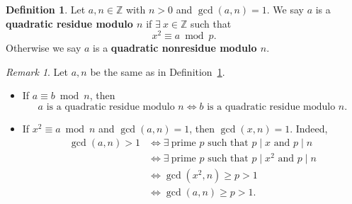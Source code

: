 \documentclass{amsbook}
\theoremstyle{plain}
\theoremstyle{definition}
\newtheorem{definition}[theorem]{Definition}
\theoremstyle{remark}
\newtheorem{remark}[theorem]{Remark}
\numberwithin{equation}{chapter}
\numberwithin{figure}{chapter}
\newcommand{\Z}{\mathbb{Z}}
\begin{document}
\begin{definition}\label{def:qr}
  Let $a, n \in \Z$ with $n > 0$ and $\gcd (a, n) = 1$. We say $a$ is a \textbf{quadratic residue modulo $n$} if $\exists~ x \in \Z$ such that
  \[
    x^2 \equiv a \bmod p.
  \]
  Otherwise we say $a$ is a \textbf{quadratic nonresidue modulo $n$}.
\end{definition}
\begin{remark}\label{rmk:qr}
  Let $a, n$ be the same as in Definition~\ref{def:qr}.
  \begin{itemize}
  \item If $a \equiv b \bmod n$, then
    \[
      \text{$a$ is a quadratic residue modulo $n$} \iff \text{$b$ is a quadratic residue modulo $n$}.
    \]
  \item If $x^2 \equiv a \bmod n$ and $\gcd (a, n) = 1$, then $\gcd (x, n) = 1$. Indeed,
    \begin{align}
      \gcd (a, n) > 1 &\iff \text{$\exists~\text{prime }p$ such that $p \mid x$ and $p \mid n$}\\
                      &\iff \text{$\exists~\text{prime }p$ such that $p \mid x^2$ and $p \mid n$} \\
                      &\iff \gcd (x^2, n) \geqslant p > 1 \\
                      &\iff \gcd (a, n) \geqslant p > 1.
    \end{align}
  \end{itemize}
\end{remark}
 
\end{document}
